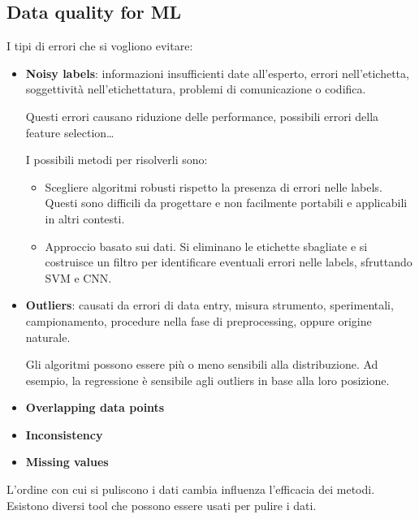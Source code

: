 \subsection{Data quality for ML}
I tipi di errori che si vogliono evitare:
\begin{itemize}
      \item \textbf{Noisy labels}: informazioni insufficienti date all'esperto,
            errori nell'etichetta, soggettività nell'etichettatura, problemi di
            comunicazione o codifica.

            Questi errori causano riduzione delle performance, possibili errori
            della feature selection\dots

            I possibili metodi per risolverli sono:
            \begin{itemize}
                  \item Scegliere algoritmi robusti rispetto la presenza di errori
                        nelle labels. Questi sono difficili da progettare e non
                        facilmente portabili e applicabili in altri contesti.
                  \item Approccio basato sui dati. Si eliminano le etichette sbagliate
                        e si costruisce un filtro per identificare eventuali errori
                        nelle labels, sfruttando SVM e CNN.
            \end{itemize}
      \item \textbf{Outliers}: causati da errori di data entry, misura strumento,
            sperimentali, campionamento, procedure nella fase di preprocessing, 
            oppure origine naturale.

            Gli algoritmi possono essere più o meno sensibili alla distribuzione. 
            Ad esempio, la regressione è sensibile agli outliers in base alla 
            loro posizione.
      \item \textbf{Overlapping data points}
      \item \textbf{Inconsistency}
      \item \textbf{Missing values}
\end{itemize}

L'ordine con cui si puliscono i dati cambia influenza l'efficacia dei metodi. 
Esistono diversi tool che possono essere usati per pulire i dati.

